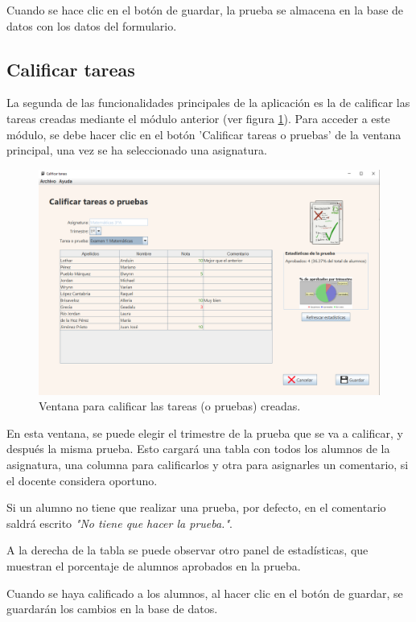 Cuando se hace clic en el botón de guardar, la prueba se almacena en la base de datos con los datos del formulario.


\subsection{Calificar tareas}
La segunda de las funcionalidades principales de la aplicación es la de calificar las tareas creadas mediante el módulo anterior (ver figura \ref{Fig:calificartarea}). Para acceder a este módulo, se debe hacer clic en el botón 'Calificar tareas o pruebas' de la ventana principal, una vez se ha seleccionado una asignatura.

\begin{figure}[h]
\centering\includegraphics[width=1\linewidth]{figs/calificartareas.png}
\caption{Ventana para calificar las tareas (o pruebas) creadas.}
\label{Fig:calificartarea}
\end{figure}

En esta ventana, se puede elegir el trimestre de la prueba que se va a calificar, y después la misma prueba. Esto cargará una tabla con todos los alumnos de la asignatura, una columna para calificarlos y otra para asignarles un comentario, si el docente considera oportuno.

Si un alumno no tiene que realizar una prueba, por defecto, en el comentario saldrá escrito \textit{"No tiene que hacer la prueba."}. 

A la derecha de la tabla se puede observar otro panel de estadísticas, que muestran el porcentaje de alumnos aprobados en la prueba.

Cuando se haya calificado a los alumnos, al hacer clic en el botón de guardar, se guardarán los cambios en la base de datos.

